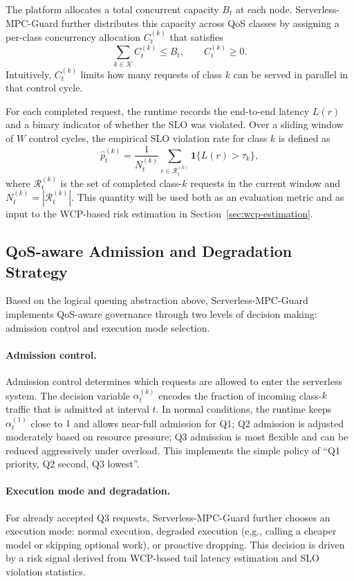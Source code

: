 \documentclass[journal]{IEEEtran}
\begin{document}
The platform allocates a total concurrent capacity $B_t$ at each node.
Serverless-MPC-Guard further distributes this capacity across QoS
classes by assigning a per-class concurrency allocation $C_t^{(k)}$
that satisfies
\[
  \sum_{k \in \mathcal{K}} C_t^{(k)} \le B_t,
  \qquad
  C_t^{(k)} \ge 0.
\]
Intuitively, $C_t^{(k)}$ limits how many requests of class $k$ can be
served in parallel in that control cycle.

For each completed request, the runtime records the end-to-end latency
$L(r)$ and a binary indicator of whether the SLO was violated. Over a
sliding window of $W$ control cycles, the empirical SLO violation rate
for class $k$ is defined as
\begin{equation}
  \hat{p}_t^{(k)}
  =
  \frac{1}{N_t^{(k)}}
  \sum_{r \in \mathcal{R}_t^{(k)}} \mathbf{1}\{L(r) > \tau_k\},
  \label{eq:slo-violation-rate}
\end{equation}
where $\mathcal{R}_t^{(k)}$ is the set of completed class-$k$
requests in the current window and $N_t^{(k)} = |\mathcal{R}_t^{(k)}|$.
This quantity will be used both as an evaluation metric and as input
to the WCP-based risk estimation in Section~\ref{sec:wcp-estimation}.

\subsection{QoS-aware Admission and Degradation Strategy}
\label{subsec:qos-admission}

Based on the logical queuing abstraction above, Serverless-MPC-Guard
implements QoS-aware governance through two levels of decision
making: admission control and execution mode selection.

\paragraph{Admission control.}
Admission control determines which requests are allowed to enter the
serverless system. The decision variable $\alpha_t^{(k)}$ encodes the
fraction of incoming class-$k$ traffic that is admitted at interval
$t$. In normal conditions, the runtime keeps $\alpha_t^{(1)}$ close to
$1$ and allows near-full admission for Q1; Q2 admission is adjusted
moderately based on resource pressure; Q3 admission is most flexible
and can be reduced aggressively under overload. This implements the
simple policy of ``Q1 priority, Q2 second, Q3 lowest''.

\paragraph{Execution mode and degradation.}
For already accepted Q3 requests, Serverless-MPC-Guard further chooses
an execution mode: normal execution, degraded execution (e.g., calling
a cheaper model or skipping optional work), or proactive dropping.
This decision is driven by a risk signal derived from WCP-based tail
latency estimation and SLO violation statistics.
\end{document}
